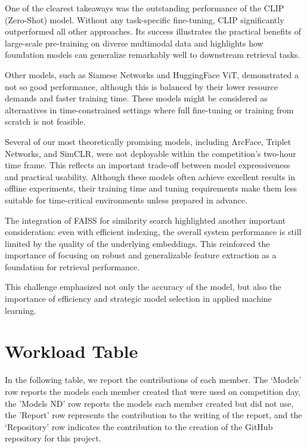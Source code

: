\documentclass[10pt,twocolumn,letterpaper]{article}
\begin{document}
One of the clearest takeaways was the outstanding performance of the CLIP (Zero-Shot) model. Without any task-specific fine-tuning, CLIP significantly outperformed all other approaches. Its success illustrates the practical benefits of large-scale pre-training on diverse multimodal data and highlights how foundation models can generalize remarkably well to downstream retrieval tasks.

Other models, such as Siamese Networks and HuggingFace ViT, demonstrated a not so good performance, although this is balanced by their lower resource demands and faster training time. These models might be considered as alternatives in time-constrained settings where full fine-tuning or training from scratch is not feasible.

Several of our most theoretically promising models, including ArcFace, Triplet Networks, and SimCLR, were not deployable within the competition's two-hour time frame. This reflects an important trade-off between model expressiveness and practical usability. Although these models often achieve excellent results in offline experiments, their training time and tuning requirements make them less suitable for time-critical environments unless prepared in advance.

The integration of FAISS for similarity search highlighted another important consideration: even with efficient indexing, the overall system performance is still limited by the quality of the underlying embeddings. This reinforced the importance of focusing on robust and generalizable feature extraction as a foundation for retrieval performance.

This challenge emphasized not only the accuracy of the model, but also the importance of efficiency and strategic model selection in applied machine learning.

\section{Workload Table}
In the following table, we report the contributions of each member. The ‘Models’ row reports the models each member created that were used on competition day, the 'Models ND' row reports the models each member created but did not use, the 'Report' row represents the contribution to the writing of the report, and the ‘Repository’ row indicates the contribution to the creation of the GitHub repository for this project.
\end{document}
